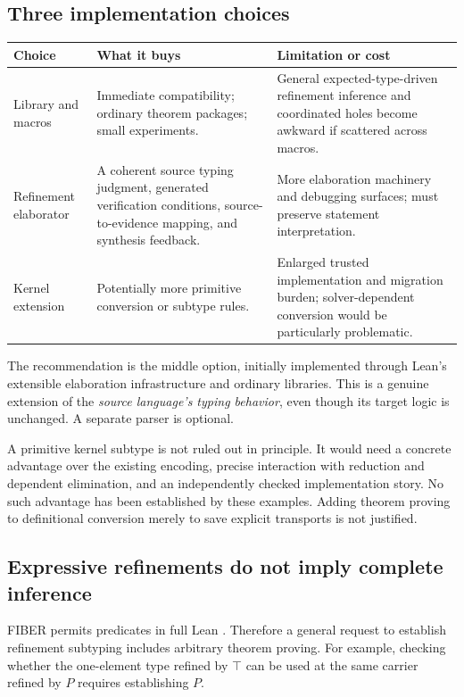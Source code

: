 \documentclass[11pt,letterpaper]{article}
\theoremstyle{definition}\newtheorem{definition}[theorem]{Definition}
\newcommand{\code}[1]{\texttt{\detokenize{#1}}}
\begin{document}
\subsection{Three implementation choices}
\begin{center}\small
\begin{tabularx}{\textwidth}{@{}L{1.15in}YY@{}}
\toprule
Choice & What it buys & Limitation or cost\\\midrule
Library and macros & Immediate compatibility; ordinary theorem packages; small experiments. & General expected-type-driven refinement inference and coordinated holes become awkward if scattered across macros.\\
Refinement elaborator & A coherent source typing judgment, generated verification conditions, source-to-evidence mapping, and synthesis feedback. & More elaboration machinery and debugging surfaces; must preserve statement interpretation.\\
Kernel extension & Potentially more primitive conversion or subtype rules. & Enlarged trusted implementation and migration burden; solver-dependent conversion would be particularly problematic.\\
\bottomrule
\end{tabularx}
\end{center}
The recommendation is the middle option, initially implemented through Lean's extensible elaboration infrastructure and ordinary libraries. This is a genuine extension of the \emph{source language's typing behavior}, even though its target logic is unchanged. A separate parser is optional.

A primitive kernel subtype is not ruled out in principle. It would need a concrete advantage over the existing encoding, precise interaction with reduction and dependent elimination, and an independently checked implementation story. No such advantage has been established by these examples. Adding theorem proving to definitional conversion merely to save explicit transports is not justified.

\subsection{Expressive refinements do not imply complete inference}
FIBER permits predicates in full Lean \code{Prop}. Therefore a general request to establish refinement subtyping includes arbitrary theorem proving. For example, checking whether the one-element type refined by $\top$ can be used at the same carrier refined by $P$ requires establishing $P$.
\end{document}
